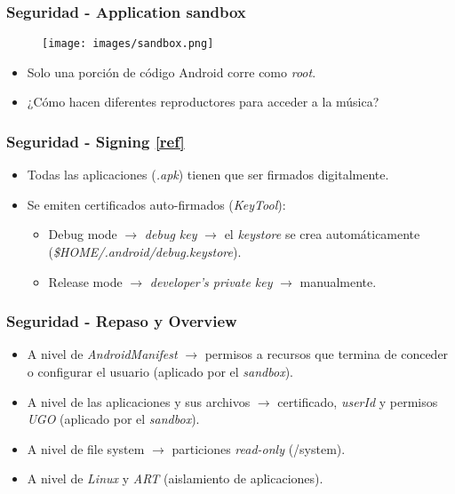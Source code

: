 \begin{frame}
  \frametitle{Seguridad - Application sandbox}
  \begin{figure}
    \centering
    \texttt{[image: images/sandbox.png]}
  \end{figure}
  
  \begin{itemize}
      \item Solo una porción de código Android corre como \textit{root}.
      
      \item ¿Cómo hacen diferentes reproductores para acceder a la música?
  \end{itemize}
\end{frame}

\begin{frame}
  \frametitle{Seguridad - Signing \href{https://developer.android.com/studio/publish/app-signing}{[ref]}}
  \begin{itemize}
    \item Todas las aplicaciones (\textit{.apk}) tienen que ser firmados digitalmente.

    \item Se emiten certificados auto-firmados (\textit{KeyTool}):
    \begin{itemize}
  \item Debug mode $\rightarrow$ \textit{debug key} $\rightarrow$ el \textit{keystore} se crea automáticamente (\textit{\$HOME/.android/debug.keystore}).
  
  \item Release mode $\rightarrow$ \textit{developer's private key} $\rightarrow$ manualmente.
    \end{itemize}    
  \end{itemize}
\end{frame}

\begin{frame}
  \frametitle{Seguridad - Repaso y Overview}
  \begin{itemize}
   \item A nivel de \textit{AndroidManifest} $\rightarrow$ permisos a recursos que termina de conceder o configurar el usuario (aplicado por el \textit{sandbox}).
   
   \item A nivel de las aplicaciones y sus archivos $\rightarrow$ certificado, \textit{userId} y permisos \textit{UGO} (aplicado por el \textit{sandbox}).
   
   \item A nivel de file system $\rightarrow$ particiones \textit{read-only} (/system).
   
   \item A nivel de \textit{Linux} y \textit{ART} (aislamiento de aplicaciones).
  \end{itemize}
\end{frame}

